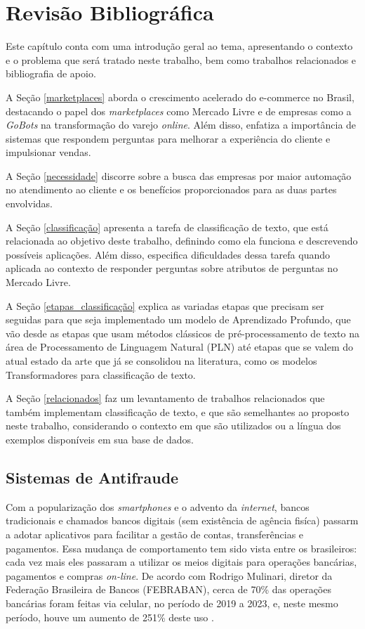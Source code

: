 \chapter{Revisão Bibliográfica}
\label{cap-revisao-bibliografica}
Este capítulo conta com uma introdução geral ao tema, apresentando o contexto e o problema que será tratado neste trabalho, bem como trabalhos relacionados e bibliografia de apoio.

A Seção \ref{marketplaces} aborda o crescimento acelerado do e-commerce no Brasil, destacando o papel dos \textit{marketplaces} como Mercado Livre e de empresas como a \textit{GoBots} na transformação do varejo \textit{online}. Além disso, enfatiza a importância de sistemas que respondem perguntas para melhorar a experiência do cliente e impulsionar vendas.

A Seção \ref{necessidade} discorre sobre a busca das empresas por maior automação no atendimento ao cliente e os benefícios proporcionados para as duas partes envolvidas.

A Seção \ref{classificação} apresenta a tarefa de classificação de texto, que está relacionada ao objetivo deste trabalho, definindo como ela funciona e descrevendo possíveis aplicações. Além disso, especifica dificuldades dessa tarefa quando aplicada ao contexto de responder perguntas sobre atributos de perguntas no Mercado Livre.

A Seção \ref{etapas_classificação} explica as variadas etapas que precisam ser seguidas para que seja implementado um modelo de Aprendizado Profundo, que vão desde as etapas que usam métodos clássicos de pré-processamento de texto na área de Processamento de Linguagem Natural (PLN) até etapas que se valem do atual estado da arte que já se consolidou na literatura, como os modelos Transformadores para classificação de texto.

A Seção \ref{relacionados} faz um levantamento de trabalhos relacionados que também implementam classificação de texto, e que são semelhantes ao proposto neste trabalho, considerando o contexto em que são utilizados ou a língua dos exemplos disponíveis em sua base de dados.

\section{Sistemas de Antifraude}
\label{antifraude}
Com a popularização dos \textit{smartphones} e o advento da \textit{internet}, bancos tradicionais e chamados bancos digitais (sem existência de agência fisíca) passarm a adotar aplicativos para facilitar a gestão de contas, transferências e pagamentos. Essa mudança de comportamento tem sido vista entre os brasileiros: cada vez mais eles passaram a utilizar os meios digitais para operações bancárias, pagamentos e compras \textit{on-line}. De acordo com Rodrigo Mulinari, diretor da Federação Brasileira de Bancos (FEBRABAN), cerca de 70\% das operações bancárias foram feitas via celular, no período de 2019 a 2023, e, neste mesmo período, houve um aumento de 251\% deste uso \cite{febraban2024}.

